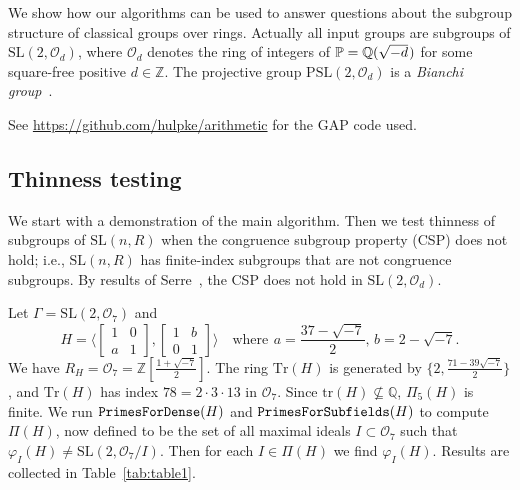 \documentclass[11pt]{amsart}
\theoremstyle{definition}
\theoremstyle{remark}
\newcommand{\Z}{\mathbb{Z}}
\newcommand{\Q}{\mathbb{Q}}
\renewcommand{\P}{\mathbb{P}}
\newcommand{\G}{{\Gamma}}
\newcommand{\SL}{\mathrm{SL}}
\newcommand{\PSL}{\mathrm{PSL}}
\newcommand{\tr}{\mathrm{tr}}
\begin{document}
We show how our algorithms can be used to answer questions about the
 subgroup structure of classical groups over rings. Actually all input groups 
are subgroups of $\SL(2,\mathcal{O}_d)$, where $\mathcal{O}_d$ denotes the 
ring of integers of $\P=\Q(\sqrt{-d}\hspace{.75pt})$ for some square-free 
positive $d\in \Z$. The projective group $\PSL(2,\mathcal{O}_d)$ is
 a \emph{Bianchi group}~\cite{Fine}.

See \url{https://github.com/hulpke/arithmetic} for the {\sf GAP}
code used.

\subsection{Thinness testing}
\label{O7}
We start with a demonstration of the main algorithm. Then we test thinness 
of subgroups of $\SL(n, R)$ when the congruence subgroup property (CSP) does 
not hold; i.e., $\SL(n,R)$ has finite-index subgroups that are not
 congruence subgroups. By results of Serre~\cite{Serre}, the CSP does
not hold in $\SL(2,\mathcal{O}_d)$.

Let $\G = \SL(2, \mathcal{O}_7)$ and
\[
H = \big\langle \begin{bmatrix}
                 1&0\\a&1\end{bmatrix},
                \begin{bmatrix} 1&b 
								\\ 0&1 \end{bmatrix} 
	\big\rangle \quad \text{where} \ \, a = \frac{37-\sqrt{-7}}{2}, \, 
	 b = 2-\sqrt{-7}.
\]
We have $R_H=\mathcal{O}_7=\Z[\frac{1+\sqrt{-7}}{2}]$. 
The ring  $\mathrm{Tr}(H)$ is 
generated by $\big\{2, \frac{71-39\sqrt{-7}}{2}\big\}$, and
 $\mathrm{Tr}(H)$ has index $78=2\cdot 3\cdot 13$ in
 $\mathcal{O}_7$. Since $\tr(H) \not\subseteq \allowbreak 
\Q$, $\Pi_5(H)$ is finite.
We run ${\tt PrimesForDense}(H)$ and ${\tt PrimesForSubfields}(H)$ 
 to compute $\Pi(H)$, now defined to be the set of all maximal 
ideals $I\subset \mathcal{O}_7$ such that $\varphi_I(H)
\neq \SL(2,\mathcal{O}_7/I)$. Then for each $I \in \Pi(H)$ we 
find $\varphi_I(H)$. Results are collected in Table~\ref{tab:table1}.
\end{document}
